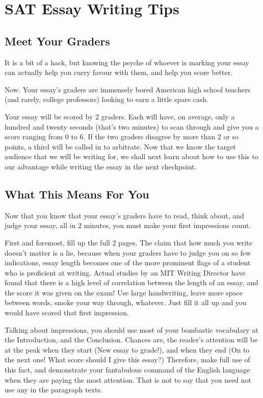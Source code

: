 \documentclass[DIV=calc,11pt,parskip,numbers=noenddot]{scrartcl} %
\begin{document}
\section{SAT Essay Writing Tips}
\subsection{Meet Your Graders}
It is a bit of a hack, but knowing the psyche of whoever is marking your essay can actually help you curry favour with them, and help you score better.

Now. Your essay’s graders are immensely bored American high school teachers (and rarely, college professors) looking to earn a little spare cash.

Your essay will be scored by 2 graders. Each will have, on average, only a hundred and twenty seconds (that's two minutes) to scan through and give you a score ranging from 0 to 6. If the two graders disagree by more than 2 or so points, a third will be called in to arbitrate. Now that we know the target audience that we will be writing for, we shall next learn about how to use this to our advantage while writing the essay in the next checkpoint.
\subsection{What This Means For You}
Now that you know that your essay’s graders have to read, think about, and judge your essay, all in 2 minutes, you must make your first impressions count.

First and foremost, fill up the full 2 pages. The claim that how much you write doesn’t matter is a lie, because when your graders have to judge you on so few indications, essay length becomes one of the more prominent flags of a student who is proficient at writing. Actual studies by an MIT Writing Director have found that there is a high level of correlation between the length of an essay, and the score it was given on the exam! Use large handwriting, leave more space between words, smoke your way through, whatever. Just fill it all up and you would have scored that first impression.

Talking about impressions, you should use most of your bombastic vocabulary at the Introduction, and the Conclusion. Chances are, the reader’s attention will be at the peak when they start (New essay to grade!), and when they end (On to the next one! What score should I give this essay?) Therefore, make full use of this fact, and demonstrate your fantabulous command of the English language when they are paying the most attention. That is not to say that you need not use any in the paragraph texts.
\end{document}

